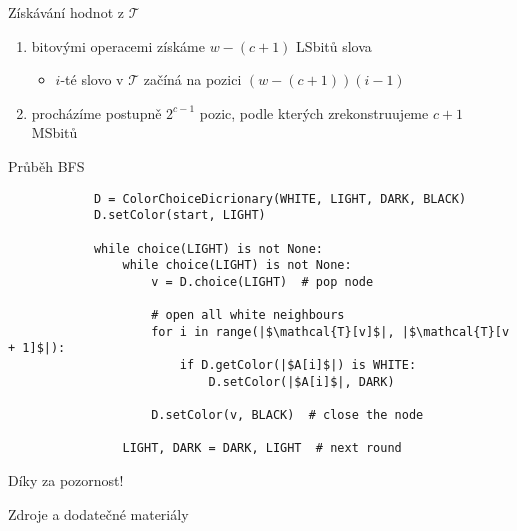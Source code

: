 \documentclass[czech]{beamer}
\begin{document}
	\begin{frame}{Získávání hodnot z $\mathcal{T}$}
		\begin{enumerate}
			\item bitovými operacemi získáme $w - (c + 1)$ LSbitů slova
			\begin{itemize}
				\item $i$-té slovo v $\mathcal{T}$ začíná na pozici $(w - (c + 1))(i - 1)$
			\end{itemize}
			\item procházíme postupně $2^{c - 1}$ pozic, podle kterých zrekonstruujeme $c + 1$ MSbitů
		\end{enumerate}
	\end{frame}


	\begin{frame}[fragile]{Průběh BFS}
		\small
		\begin{verbatim}
			D = ColorChoiceDicrionary(WHITE, LIGHT, DARK, BLACK)
			D.setColor(start, LIGHT)

			while choice(LIGHT) is not None:
				while choice(LIGHT) is not None:
					v = D.choice(LIGHT)  # pop node

					# open all white neighbours
					for i in range(|$\mathcal{T}[v]$|, |$\mathcal{T}[v + 1]$|):
						if D.getColor(|$A[i]$|) is WHITE:
							D.setColor(|$A[i]$|, DARK)

					D.setColor(v, BLACK)  # close the node

				LIGHT, DARK = DARK, LIGHT  # next round
		\end{verbatim}
	\end{frame}

	\begin{frame}[focus]
		Díky za pozornost!
	\end{frame}
	
	\appendix
	\begin{frame}{Zdroje a dodatečné materiály}
		\nocite{*}
		
		
	\end{frame}
\end{document}
